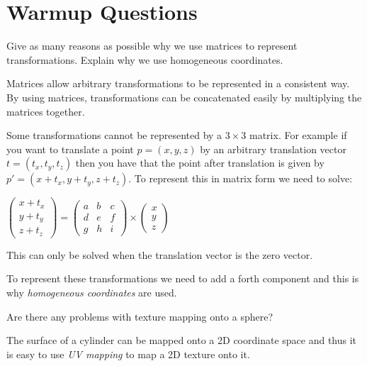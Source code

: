 \documentclass{supervision}
\begin{document}
\section*{Warmup Questions}
\begin{questions}
    \question
    Give as many reasons as possible why we use matrices to represent transformations. Explain why we use homogeneous coordinates.
    \begin{solution}
    Matrices allow arbitrary transformations to be represented in a consistent way. By using matrices, transformations can be concatenated easily by multiplying the matrices together.
    
    Some transformations cannot be represented by a $3 \times 3$ matrix. For example if you want to translate a point $p=(x,y,z)$ by an arbitrary translation vector $t=(t_x,t_y,t_z)$ then you have that the point after translation is given by $p'=(x+t_x,y+t_y,z+t_z)$. To represent this in matrix form we need to solve:
    \begin{center}
        $
        \begin{pmatrix}
        x+t_x \\
        y+t_y \\
        z+t_z 
        \end{pmatrix}
        =
        \begin{pmatrix}
        a & b & c \\ 
        d & e & f \\ 
        g & h & i
        \end{pmatrix}
        \times
        \begin{pmatrix}
        x \\
        y \\
        z 
        \end{pmatrix}
        $

    \end{center}
    
    This can only be solved when the translation vector is the zero vector.
    
    To represent these transformations we need to add a forth component and this is why \textit{homogeneous coordinates} are used.

    \end{solution}

    \question
    Are there any problems with texture mapping onto a sphere?
    \begin{solution}
    The surface of a cylinder can be mapped onto a 2D coordinate space and thus it is easy to use \textit{UV mapping} to map a 2D texture onto it.
    

\end{solution}
\end{questions}
\end{document}
